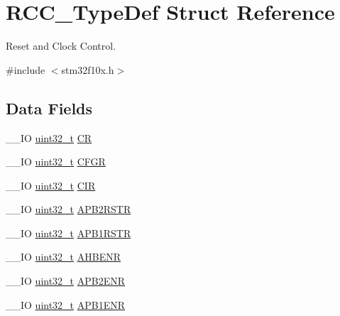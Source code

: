 \hypertarget{struct_r_c_c___type_def}{\section{R\-C\-C\-\_\-\-Type\-Def Struct Reference}
\label{struct_r_c_c___type_def}
}


Reset and Clock Control.  




{\ttfamily \#include $<$stm32f10x.\-h$>$}

\subsection*{Data Fields}
\begin{DoxyCompactItemize}
\item 
\-\_\-\-\_\-\-I\-O \hyperlink{stdint_8h_a435d1572bf3f880d55459d9805097f62}{uint32\-\_\-t} \hyperlink{struct_r_c_c___type_def_abcb9ff48b9afb990283fefad0554b5b3}{C\-R}
\item 
\-\_\-\-\_\-\-I\-O \hyperlink{stdint_8h_a435d1572bf3f880d55459d9805097f62}{uint32\-\_\-t} \hyperlink{struct_r_c_c___type_def_a0721b1b729c313211126709559fad371}{C\-F\-G\-R}
\item 
\-\_\-\-\_\-\-I\-O \hyperlink{stdint_8h_a435d1572bf3f880d55459d9805097f62}{uint32\-\_\-t} \hyperlink{struct_r_c_c___type_def_aeadf3a69dd5795db4638f71938704ff0}{C\-I\-R}
\item 
\-\_\-\-\_\-\-I\-O \hyperlink{stdint_8h_a435d1572bf3f880d55459d9805097f62}{uint32\-\_\-t} \hyperlink{struct_r_c_c___type_def_a4491ab20a44b70bf7abd247791676a59}{A\-P\-B2\-R\-S\-T\-R}
\item 
\-\_\-\-\_\-\-I\-O \hyperlink{stdint_8h_a435d1572bf3f880d55459d9805097f62}{uint32\-\_\-t} \hyperlink{struct_r_c_c___type_def_a600f4d6d592f43edb2fc653c5cba023a}{A\-P\-B1\-R\-S\-T\-R}
\item 
\-\_\-\-\_\-\-I\-O \hyperlink{stdint_8h_a435d1572bf3f880d55459d9805097f62}{uint32\-\_\-t} \hyperlink{struct_r_c_c___type_def_abaebc9204bbc1708356435a5a01e70eb}{A\-H\-B\-E\-N\-R}
\item 
\-\_\-\-\_\-\-I\-O \hyperlink{stdint_8h_a435d1572bf3f880d55459d9805097f62}{uint32\-\_\-t} \hyperlink{struct_r_c_c___type_def_a619b4c22f630a269dfd0c331f90f6868}{A\-P\-B2\-E\-N\-R}
\item 
\-\_\-\-\_\-\-I\-O \hyperlink{stdint_8h_a435d1572bf3f880d55459d9805097f62}{uint32\-\_\-t} \hyperlink{struct_r_c_c___type_def_aec7622ba90341c9faf843d9ee54a759f}{A\-P\-B1\-E\-N\-R}

\end{DoxyCompactItemize}
